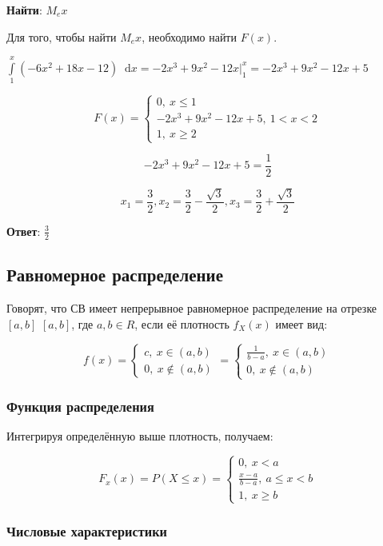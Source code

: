 \documentclass{article}
\newcommand*\diff{\mathop{}\!\mathrm{d}}
\begin{document}
\textbf{Найти}: $M_e x$

Для того, чтобы найти $M_e x$, необходимо найти $F(x)$.

$\int\limits_{1}^{x} (-6x^2 + 18x - 12) \diff x = -2x^3 + 9x^2 - 12 x \bigg|_1^x = -2x^3 + 9x^2 - 12x + 5$

$$F(x) = \begin{cases}
    0, \ x \le 1 \\
    -2x^3 + 9x^2 - 12x + 5, \ 1 < x < 2 \\
    1, \ x \ge 2
\end{cases}$$

$$-2x^3 + 9x^2 - 12x + 5 = \frac{1}{2}$$

$$x_1 = \frac{3}{2}, x_2 = \frac{3}{2} - \frac{\sqrt{3}}{2}, x_3 = \frac{3}{2} + \frac{\sqrt{3}}{2}$$

\textbf{Ответ}: $\frac{3}{2}$

\subsection{Равномерное распределение}

Говорят, что СВ имеет непрерывное равномерное распределение на отрезке $[ a , b ]$ $[a,b]$, где $a,b \in R$, если её плотность $f_{X}(x)$ имеет вид: 

$$f(x) = \begin{cases}
    c, \ x \in (a, b) \\
    0, \ x \notin (a, b)
\end{cases} = \begin{cases}
    \frac{1}{b - a}, \ x \in (a, b) \\
    0, \ x \notin (a, b)
\end{cases}$$

\subsubsection{Функция распределения}

Интегрируя определённую выше плотность, получаем: 

$$F_x(x) = P(X \le x) = \begin{cases}
    0, \ x < a \\
    \frac{x - a}{b - a}, \ a \le x < b \\
    1, \ x \ge b
\end{cases}$$

\subsubsection{Числовые характеристики}
\end{document}

